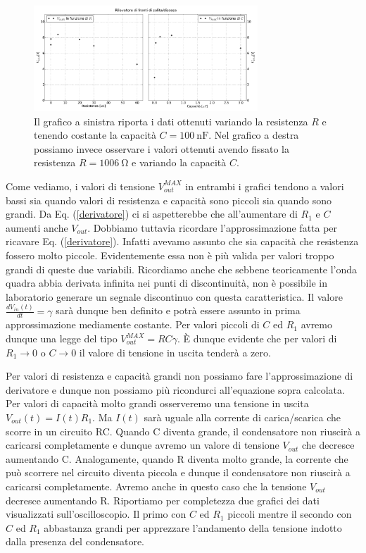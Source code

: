 \begin{figure}[h]
\center
	\includegraphics[width=0.75\textwidth]{dati.pdf}
	\caption{Il grafico a sinistra riporta i dati ottenuti variando la resistenza $R$ e tenendo costante la capacità $C = \SI{100}{\nano\farad}$. Nel grafico a destra possiamo invece osservare i valori ottenuti avendo fissato la resistenza $R=\SI{1006}{\ohm}$ e variando la capacità $C$.}
	\label{fig:dati}
\end{figure}


Come vediamo, i valori di tensione $V_{out}^{MAX}$ in entrambi i grafici tendono a valori bassi sia quando valori di resistenza e capacità sono piccoli sia quando sono grandi. Da Eq. (\ref{derivatore}) ci si aspetterebbe che all'aumentare di $R_1$ e $C$ aumenti anche $V_{out}$. Dobbiamo tuttavia ricordare l'approssimazione fatta per ricavare Eq. (\ref{derivatore}). Infatti avevamo assunto che sia capacità che resistenza fossero molto piccole. Evidentemente essa non è più valida per valori troppo grandi di queste due variabili. Ricordiamo anche che sebbene teoricamente l'onda quadra abbia derivata infinita nei punti di discontinuità, non è possibile in laboratorio generare un segnale discontinuo con questa caratteristica. Il valore $\frac{dV_{in}(t)}{dt}=\gamma$  sarà dunque ben definito e potrà essere assunto in prima approssimazione mediamente costante. Per valori piccoli di $C$ ed $R_1$ avremo dunque una legge del tipo $V_{out}^{MAX}= RC \gamma$. \`E dunque evidente che per valori di $R_1\rightarrow 0$ o $C\rightarrow 0$ il valore di tensione in uscita tenderà a zero.

Per valori di resistenza e capacità grandi non possiamo fare l'approssimazione di derivatore e dunque non possiamo più ricondurci all'equazione sopra calcolata.
Per valori di capacità molto grandi osserveremo una tensione in uscita $V_{out}(t)=I(t) R_1$. Ma $I(t)$ sarà uguale alla corrente di carica/scarica che scorre in un circuito RC.
Quando C diventa grande, il condensatore non riuscirà a caricarsi completamente e dunque avremo un valore di tensione $V_{out}$ che decresce aumentando C.
Analogamente, quando R diventa molto grande, la corrente che può scorrere nel circuito diventa piccola e dunque il condensatore non riuscirà a caricarsi completamente.
Avremo anche in questo caso che la tensione $V_{out}$ decresce aumentando R.
Riportiamo per completezza due grafici dei dati visualizzati sull'oscilloscopio.
Il primo con $C$ ed $R_1$ piccoli mentre il secondo con $C$ ed $R_1$ abbastanza grandi per apprezzare l'andamento della tensione indotto dalla presenza del condensatore.

